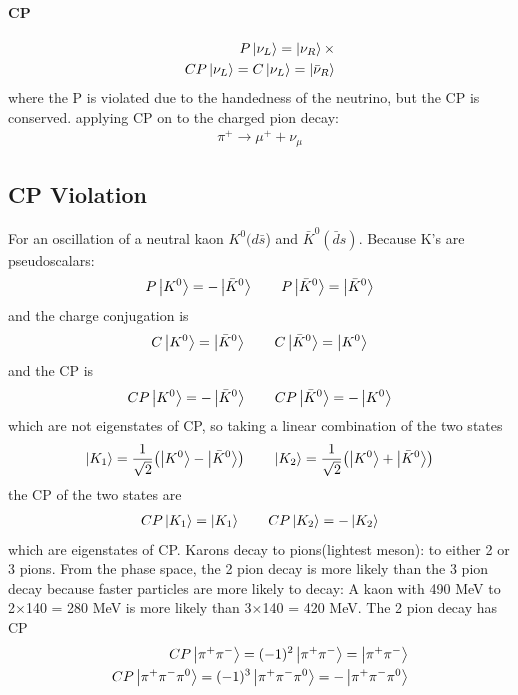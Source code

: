 \documentclass[../main.tex]{subfiles}
\begin{document}
\begin{enumerate}
    \paragraph*{CP} 
    \begin{align*}
        P\ket{\nu_L} = \ket{\nu_R} \times \\
        CP \ket{\nu_L} = C\ket{\nu_L} = \ket{\bar \nu_R}
    \end{align*} 
    where the P is violated due to the handedness of the neutrino, but the CP is conserved. applying
    CP on to the charged pion decay:
    \begin{align*}
        \pi^+ \to \mu^+ + \nu_\mu
    \end{align*}
\end{enumerate}
\subsection*{CP Violation}
For an oscillation of a neutral kaon $K^0(d\bar s$) and $\bar K^0 (\bar d s)$. Because K's are 
pseudoscalars:
\begin{align*}
    P\ket{K^0} = -\ket{\bar K^0} \qquad P\ket{\bar K^0} = \ket{\bar K^0}
\end{align*}
and the charge conjugation is
\begin{align*}
    C\ket{K^0} = \ket{\bar K^0} \qquad C\ket{\bar K^0} = \ket{K^0}
\end{align*}
and the CP is
\begin{align*}
    CP\ket{K^0} = -\ket{\bar K^0} \qquad CP\ket{\bar K^0} = -\ket{K^0}
\end{align*}
which are not eigenstates of CP, so taking a linear combination of the two states
\begin{align*}
    \ket{K_1} = \frac{1}{\sqrt{2}} \qt(\ket{K^0} - \ket{\bar K^0}) \qquad
    \ket{K_2} = \frac{1}{\sqrt{2}} \qt(\ket{K^0} + \ket{\bar K^0})
\end{align*}
the CP of the two states are
\begin{align*}
    CP\ket{K_1} = \ket{K_1} \qquad CP\ket{K_2} = -\ket{K_2}
\end{align*}
which are eigenstates of CP. Karons decay to pions(lightest meson): to either 2 or 3 pions. From the
phase space, the 2 pion decay is more likely than the 3 pion decay because faster particles are
more likely to decay: A kaon with 490 MeV to 2$\times$140 = 280 MeV is more likely than 3$\times$140
= 420 MeV. The 2 pion decay has CP
\begin{align*}
    CP\ket{\pi^+\pi^-} = (-1)^2 \ket{\pi^+\pi^-} = \ket{\pi^+ \pi^-} \\
    CP\ket{\pi^+\pi^-\pi^0} =  (-1)^3 \ket{\pi^+\pi^-\pi^0} = -\ket{\pi^+\pi^-\pi^0}
\end{align*}
\end{document}
